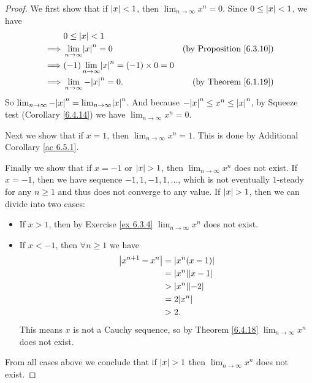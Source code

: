 \begin{proof}
    We first show that if \(\abs*{x} < 1\), then \(\lim_{n \to \infty} x^n = 0\).
    Since \(0 \leq \abs*{x} < 1\), we have
    \begin{align*}
                 & 0 \leq \abs*{x} < 1                                                                           \\
        \implies & \lim_{n \to \infty} \abs*{x}^n = 0                     & \text{(by Proposition \ref{6.3.10})} \\
        \implies & (-1)\lim_{n \to \infty} \abs*{x}^n = (-1) \times 0 = 0                                        \\
        \implies & \lim_{n \to \infty} -\abs*{x}^n = 0.                   & \text{(by Theorem \ref{6.1.19})}
    \end{align*}
    So \(\lim_{n \to \infty} -\abs*{x}^n = \lim_{n \to \infty} \abs*{x}^n\).
    And because \(-\abs*{x}^n \leq x^n \leq \abs*{x}^n\), by Squeeze test (Corollary \ref{6.4.14}) we have \(\lim_{n \to \infty} x^n = 0\).

    Next we show that if \(x = 1\), then \(\lim_{n \to \infty} x^n = 1\).
    This is done by Additional Corollary \ref{ac 6.5.1}.

    Finally we show that if \(x = -1\) or \(\abs*{x} > 1\), then \(\lim_{n \to \infty} x^n\) does not exist.
    If \(x = -1\), then we have sequence \(-1, 1, -1, 1, \dots\), which is not eventually \(1\)-steady for any \(n \geq 1\) and thus does not converge to any value.
    If \(\abs*{x} > 1\), then we can divide into two cases:
    \begin{itemize}
        \item If \(x > 1\), then by Exercise \ref{ex 6.3.4} \(\lim_{n \to \infty} x^n\) does not exist.
        \item If \(x < -1\), then \(\forall n \geq 1\) we have
              \begin{align*}
                  \abs*{x^{n + 1} - x^n} & = \abs*{x^n(x - 1)}      \\
                                         & = \abs*{x^n}\abs*{x - 1} \\
                                         & > \abs*{x^n}\abs*{-2}    \\
                                         & = 2\abs*{x^n}            \\
                                         & > 2.
              \end{align*}
              This means \(x\) is not a Cauchy sequence, so by Theorem \ref{6.4.18} \(\lim_{n \to \infty} x^n\) does not exist.
    \end{itemize}
    From all cases above we conclude that if \(\abs*{x} > 1\) then \(\lim_{n \to \infty} x^n\) does not exist.
\end{proof}

